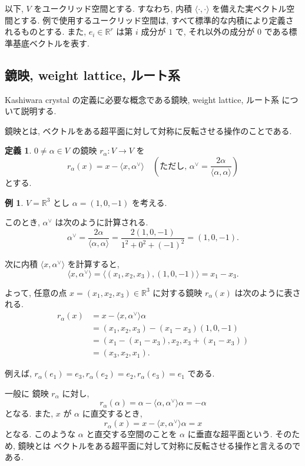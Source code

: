 \documentclass[
  a4paper, 
  12pt,
  ja=standard,
  xelatex,
  left=30truemm,
  right=30truemm,
  titlepage 
]{bxjsarticle}
\theoremstyle{definition}
\newtheorem{df}{定義}[section]
\newtheorem*{ex}{例}
\begin{document}
以下, $V$ をユークリッド空間とする. すなわち, 内積 $\langle \cdot, \cdot \rangle$ を備えた実ベクトル空間とする. 
例で使用するユークリッド空間は, すべて標準的な内積により定義されるものとする. 
また, $e_i \in \mathbb{R}^r$ は第 $i$ 成分が $1$ で, それ以外の成分が $0$ である標準基底ベクトルを表す.

\subsection{鏡映, weight lattice, ルート系}
Kashiwara crystal の定義に必要な概念である鏡映, weight lattice, ルート系
について説明する.

鏡映とは, ベクトルをある超平面に対して対称に反転させる操作のことである.

\begin{df}
  $0 \neq  \alpha \in V $ の鏡映 $r_\alpha: V \to V $ を
  \[
  r_\alpha (x) = x - \langle x , \alpha^{ \vee } \rangle \quad \left(\text{ただし, } \alpha^{ \vee } = \frac{2 \alpha}{\langle \alpha, \alpha \rangle} \right)
  \]
  とする.
\end{df}

\begin{ex}
  $V = \mathbb{R}^3$ とし $\alpha = (1, 0, -1)$ を考える.

  このとき, $\alpha^{\vee}$ は次のように計算される.
  \[
  \alpha^{\vee} = \frac{2 \alpha}{\langle \alpha, \alpha \rangle} = \frac{2 (1, 0, -1)}{1^2 + 0^2 + (-1)^2} = (1, 0, -1).
  \]

  次に内積 $\langle x, \alpha^{\vee} \rangle$ を計算すると,
  \[
  \langle x, \alpha^{\vee} \rangle = \langle (x_1, x_2, x_3), (1, 0, -1) \rangle = x_1 - x_3.
  \]

  よって, 任意の点 $x = (x_1, x_2, x_3) \in \mathbb{R}^3$ に対する鏡映 $r_\alpha(x)$ は次のように表される.
  \[
  \begin{aligned}
    r_\alpha(x) 
    &= x - \langle x, \alpha^{\vee} \rangle \alpha \\
    &= (x_1, x_2, x_3) - (x_1 - x_3)(1, 0, -1) \\
    &= \left( x_1 - (x_1 - x_3), x_2, x_3 + (x_1 - x_3) \right) \\
    &= \left( x_3, x_2, x_1 \right).
  \end{aligned}
  \]

  例えば,
  $r_\alpha(e_1) = e_3, r_\alpha(e_2) = e_2, r_\alpha(e_3) = e_1$
  である.
\end{ex}

一般に 鏡映 $r_\alpha$ に対し,
$$r_\alpha(\alpha) = \alpha - \langle \alpha, \alpha^{\vee} \rangle \alpha = - \alpha$$
となる. また, $x$ が $\alpha$ に直交するとき,
$$r_\alpha(x) = x - \langle x, \alpha^{\vee} \rangle \alpha = x$$
となる. このような $\alpha$ と直交する空間のことを $\alpha$ に垂直な超平面という.
そのため, 鏡映とは ベクトルをある超平面に対して対称に反転させる操作と言えるのである.
\end{document}
